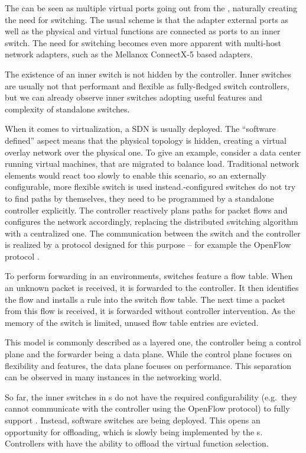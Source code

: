 The  can be seen as multiple virtual
ports going out from the , naturally creating the need for switching.
The usual scheme is that the adapter external ports as well as the physical and
virtual functions are connected as ports to an inner switch. The need for
switching becomes even more apparent with multi-host network adapters, such
as the Mellanox ConnectX-5 \cite{mlx5-pb} based adapters.

The existence of an inner switch is not hidden by the controller. Inner switches
are usually not that performant and flexible as fully-fledged switch controllers,
but we can already observe inner switches adopting useful features and
complexity of standalone switches.

When it comes to virtualization, a \acrfull{SDN} is usually
deployed. The ``software defined'' aspect means that the physical topology is
hidden, creating a virtual overlay network over the physical one.
To give an example, consider a data center running virtual machines, that are
migrated to balance load. Traditional network elements would react too
slowly to enable this scenario, so an externally configurable, more flexible
switch is used instead.-configured switches do not try to find paths by
themselves, they need to be programmed by a standalone  controller
explicitly. The controller reactively plans paths for packet flows and
configures the network accordingly, replacing the distributed switching
algorithm with a centralized one. The
communication between the switch and the controller is realized by a protocol
designed for this purpose -- for example the OpenFlow protocol \cite{openflow}.

To perform forwarding in an  environments, switches feature a flow table. When
an unknown packet is received, it is forwarded to the controller. It then
identifies the flow and installs a rule into the switch flow table. The next time
a packet from this flow is received, it is forwarded without controller
intervention. As the memory of the switch is limited, unused flow table entries
are evicted.

This model is commonly described as a layered one, the controller being
a control plane and the forwarder being a data plane. While the control plane
focuses on flexibility and features, the data plane focuses on performance. This
separation can be observed in many instances in the networking world.

So far, the inner switches in s do not have the required configurability
(e.g.\ they cannot communicate with the controller using the OpenFlow protocol)
to fully support . Instead, software switches are being deployed. This
opens an opportunity for offloading, which is slowly being implemented by the
s. Controllers with  have the ability to offload the virtual
function selection.

